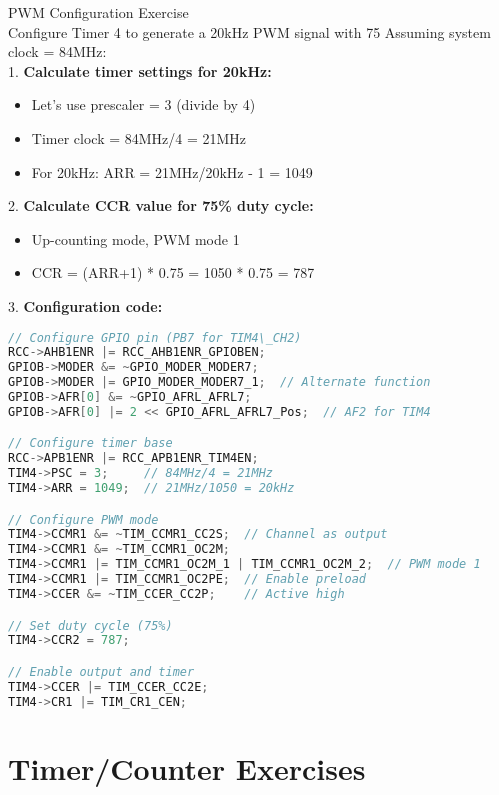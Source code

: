 \begin{example2}{PWM Configuration Exercise}\\
Configure Timer 4 to generate a 20kHz PWM signal with 75%
\tcblower
Assuming system clock = 84MHz:\\
1. \textbf{Calculate timer settings for 20kHz:}
\begin{itemize}
    \item Let's use prescaler = 3 (divide by 4)
    \item Timer clock = 84MHz/4 = 21MHz
    \item For 20kHz: ARR = 21MHz/20kHz - 1 = 1049
\end{itemize}
\vspace{2mm}
2. \textbf{Calculate CCR value for 75\% duty cycle:}
\begin{itemize}
    \item Up-counting mode, PWM mode 1
    \item CCR = (ARR+1) * 0.75 = 1050 * 0.75 = 787
\end{itemize}
\vspace{2mm}
3. \textbf{Configuration code:}
\begin{lstlisting}[language=C, style=basesmol]
// Configure GPIO pin (PB7 for TIM4\_CH2)
RCC->AHB1ENR |= RCC_AHB1ENR_GPIOBEN;
GPIOB->MODER &= ~GPIO_MODER_MODER7;
GPIOB->MODER |= GPIO_MODER_MODER7_1;  // Alternate function
GPIOB->AFR[0] &= ~GPIO_AFRL_AFRL7;
GPIOB->AFR[0] |= 2 << GPIO_AFRL_AFRL7_Pos;  // AF2 for TIM4

// Configure timer base
RCC->APB1ENR |= RCC_APB1ENR_TIM4EN;
TIM4->PSC = 3;     // 84MHz/4 = 21MHz
TIM4->ARR = 1049;  // 21MHz/1050 = 20kHz

// Configure PWM mode
TIM4->CCMR1 &= ~TIM_CCMR1_CC2S;  // Channel as output
TIM4->CCMR1 &= ~TIM_CCMR1_OC2M;
TIM4->CCMR1 |= TIM_CCMR1_OC2M_1 | TIM_CCMR1_OC2M_2;  // PWM mode 1
TIM4->CCMR1 |= TIM_CCMR1_OC2PE;  // Enable preload
TIM4->CCER &= ~TIM_CCER_CC2P;    // Active high

// Set duty cycle (75%)
TIM4->CCR2 = 787;

// Enable output and timer
TIM4->CCER |= TIM_CCER_CC2E;
TIM4->CR1 |= TIM_CR1_CEN;
\end{lstlisting}
\end{example2}

\section{Timer/Counter Exercises}

